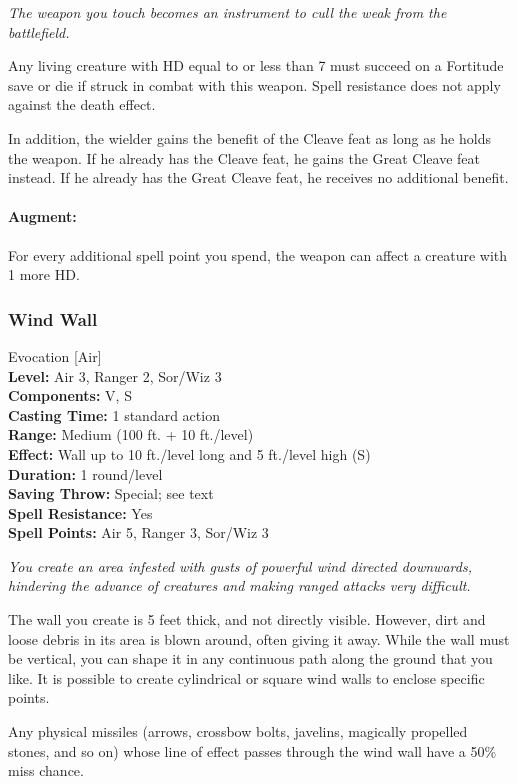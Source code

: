 \emph{The weapon you touch becomes an instrument to cull the weak from the battlefield.} 

Any living creature with HD equal to or less than 7 must succeed on a Fortitude save or die if struck in combat with this weapon. 
Spell resistance does not apply against the death effect.

In addition, the wielder gains the benefit of the Cleave feat as long as he holds the weapon. If he already has the Cleave feat, he gains the Great Cleave feat instead. If he already has the Great Cleave feat, he receives no additional benefit.

\paragraph{Augment:} For every additional spell point you spend, the weapon can affect a creature with 1 more HD.

\subsubsection{Wind Wall}
\label{Spell:WindWall}
Evocation [Air]
\\ \textbf{Level:} Air 3, Ranger 2, Sor/Wiz 3
\\ \textbf{Components:} V, S
\\ \textbf{Casting Time:} 1 standard action
\\ \textbf{Range:} Medium (100 ft. + 10 ft./level)
\\ \textbf{Effect:} Wall up to 10 ft./level long and 5 ft./level high (S)
\\ \textbf{Duration:} 1 round/level
\\ \textbf{Saving Throw:} Special; see text
\\ \textbf{Spell Resistance:} Yes
\\ \textbf{Spell Points:} Air 5, Ranger 3, Sor/Wiz 3

\emph{You create an area infested with gusts of powerful wind directed downwards, hindering the advance of creatures and making ranged attacks very difficult.}

The wall you create is 5 feet thick, and not directly visible. However, dirt and loose
debris in its area is blown around, often giving it away. While the wall must be vertical, 
you can shape it in any continuous path along the ground that you like. 
It is possible to create cylindrical or square wind walls to enclose specific points.

Any physical missiles (arrows, crossbow bolts, javelins, magically propelled stones, and so on) whose line of effect passes through the
wind wall have a 50\% miss chance.

